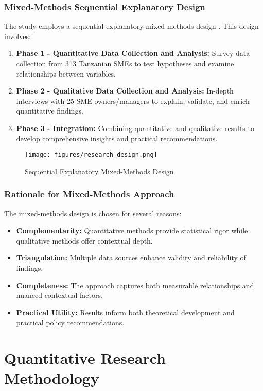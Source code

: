 \subsubsection{Mixed-Methods Sequential Explanatory Design}
The study employs a sequential explanatory mixed-methods design \citep{creswell2018research}. This design involves:
\begin{enumerate}
    \item \textbf{Phase 1 - Quantitative Data Collection and Analysis:} Survey data collection from 313 Tanzanian SMEs to test hypotheses and examine relationships between variables.
    \item \textbf{Phase 2 - Qualitative Data Collection and Analysis:} In-depth interviews with 25 SME owners/managers to explain, validate, and enrich quantitative findings.
    \item \textbf{Phase 3 - Integration:} Combining quantitative and qualitative results to develop comprehensive insights and practical recommendations.
\end{enumerate}

\begin{figure}[H]
\centering
\texttt{[image: figures/research\_design.png]}
\caption{Sequential Explanatory Mixed-Methods Design}
\label{fig:research_design}
\end{figure}

\subsubsection{Rationale for Mixed-Methods Approach}
The mixed-methods design is chosen for several reasons:
\begin{itemize}
    \item \textbf{Complementarity:} Quantitative methods provide statistical rigor while qualitative methods offer contextual depth.
    \item \textbf{Triangulation:} Multiple data sources enhance validity and reliability of findings.
    \item \textbf{Completeness:} The approach captures both measurable relationships and nuanced contextual factors.
    \item \textbf{Practical Utility:} Results inform both theoretical development and practical policy recommendations.
\end{itemize}

\section{Quantitative Research Methodology}

